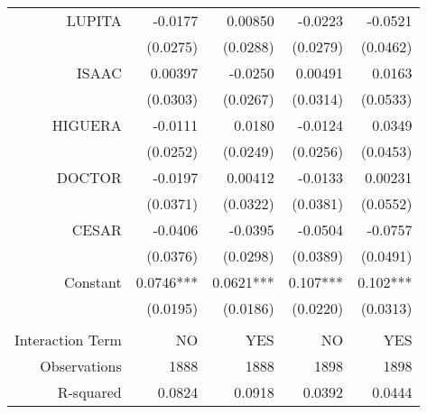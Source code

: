 \begin{tabular}{rrrrr}
LUPITA & -0.0177 & 0.00850 & -0.0223 & -0.0521 \\
      & (0.0275) & (0.0288) & (0.0279) & (0.0462) \\
ISAAC & 0.00397 & -0.0250 & 0.00491 & 0.0163 \\
      & (0.0303) & (0.0267) & (0.0314) & (0.0533) \\
HIGUERA & -0.0111 & 0.0180 & -0.0124 & 0.0349 \\
      & (0.0252) & (0.0249) & (0.0256) & (0.0453) \\
DOCTOR & -0.0197 & 0.00412 & -0.0133 & 0.00231 \\
      & (0.0371) & (0.0322) & (0.0381) & (0.0552) \\
CESAR & -0.0406 & -0.0395 & -0.0504 & -0.0757 \\
      & (0.0376) & (0.0298) & (0.0389) & (0.0491) \\
Constant  & 0.0746*** & 0.0621*** & 0.107*** & 0.102*** \\
      & (0.0195) & (0.0186) & (0.0220) & (0.0313) \\
      &       &       &       &  \\
Interaction Term & NO    & YES   & NO    & YES \\
Observations & 1888  & 1888  & 1898  & 1898 \\
R-squared & 0.0824 & 0.0918 & 0.0392 & 0.0444 \\
\bottomrule
\end{tabular}%
